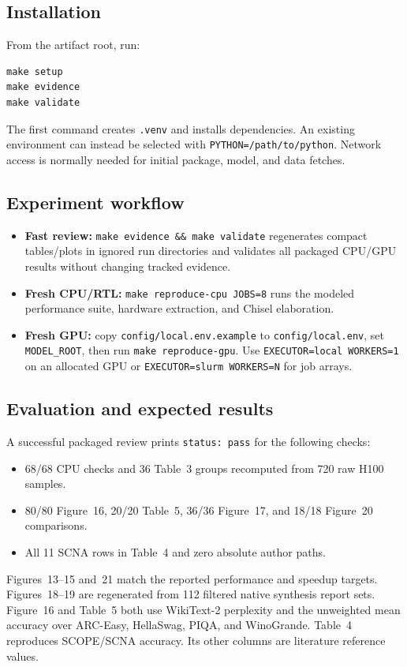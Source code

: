 \documentclass{sigplanconf}
\begin{document}
\subsection{Installation}

From the artifact root, run:
\begin{verbatim}
make setup
make evidence
make validate
\end{verbatim}
The first command creates \texttt{.venv} and installs dependencies.  An
existing environment can instead be selected with
\texttt{PYTHON=/path/to/python}.
Network access is normally needed for initial package, model, and data fetches.

\subsection{Experiment workflow}

\begin{itemize}[leftmargin=*]
  \item \textbf{Fast review:} \texttt{make evidence \&\& make validate}
    regenerates compact tables/plots in ignored run directories and validates
    all packaged CPU/GPU results without changing tracked evidence.
  \item \textbf{Fresh CPU/RTL:} \texttt{make reproduce-cpu JOBS=8} runs the
    modeled performance suite, hardware extraction, and Chisel elaboration.
  \item \textbf{Fresh GPU:} copy \texttt{config/local.env.example} to
    \texttt{config/local.env}, set \texttt{MODEL\_ROOT}, then run
    \texttt{make reproduce-gpu}.  Use \texttt{EXECUTOR=local WORKERS=1} on an
    allocated GPU or \texttt{EXECUTOR=slurm WORKERS=N} for job arrays.
\end{itemize}

\subsection{Evaluation and expected results}

A successful packaged review prints \texttt{status: pass} for the following
checks:
\begin{itemize}[leftmargin=*]
  \item 68/68 CPU checks and 36 Table~3 groups recomputed from 720 raw H100
    samples.
  \item 80/80 Figure~16, 20/20 Table~5, 36/36 Figure~17, and 18/18 Figure~20
    comparisons.
  \item All 11 SCNA rows in Table~4 and zero absolute author paths.
\end{itemize}
Figures~13--15 and~21 match the reported performance and speedup targets.
Figures~18--19 are regenerated from 112 filtered native synthesis report sets.
Figure~16 and Table~5 both use WikiText-2 perplexity and the unweighted mean
accuracy over ARC-Easy, HellaSwag, PIQA, and WinoGrande.  Table~4 reproduces
SCOPE/SCNA accuracy.  Its other columns are literature reference values.
\end{document}
